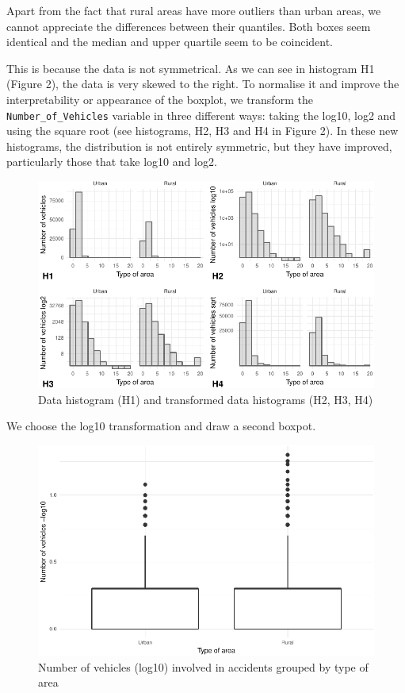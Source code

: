 \documentclass[]{article}
\begin{document}
Apart from the fact that rural areas have more outliers than urban
areas, we cannot appreciate the differences between their quantiles.
Both boxes seem identical and the median and upper quartile seem to be
coincident.

This is because the data is not symmetrical. As we can see in histogram
H1 (Figure 2), the data is very skewed to the right. To normalise it and
improve the interpretability or appearance of the boxplot, we transform
the \texttt{Number\_of\_Vehicles} variable in three different ways:
taking the log10, log2 and using the square root (see histograms, H2, H3
and H4 in Figure 2). In these new histograms, the distribution is not
entirely symmetric, but they have improved, particularly those that take
log10 and log2.

\begin{figure}[H]

{\centering \includegraphics{READMEv5_files/figure-latex/fig2-1} 

}

\caption{Data histogram (H1) and transformed data histograms (H2, H3, H4)}\label{fig:fig2}
\end{figure}

We choose the log10 transformation and draw a second boxpot.

\begin{figure}[H]

{\centering \includegraphics{READMEv5_files/figure-latex/fig3-1} 

}

\caption{Number of vehicles (log10) involved in accidents grouped by type of area}\label{fig:fig3}
\end{figure}
\end{document}
